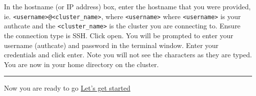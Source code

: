 \documentclass[
]{book}
\begin{document}
In the hostname (or IP address) box, enter the hostname that you were provided, ie. \texttt{\textless{}username\textgreater{}@\textless{}cluster\_name\textgreater{}}, where \texttt{\textless{}username\textgreater{}} where \texttt{\textless{}username\textgreater{}} is your authcate and the \texttt{\textless{}cluster\_name\textgreater{}} is the cluster you are connecting to. Ensure the connection type is SSH. Click open. You will be prompted to enter your username (authcate) and password in the terminal window. Enter your credentials and click enter. Note you will not see the characters as they are typed. You are now in your home directory on the cluster.

\begin{center}\rule{0.5\linewidth}{0.5pt}\end{center}

Now you are ready to go
{\href{introduction.html}{Let's get started}}
\end{document}
